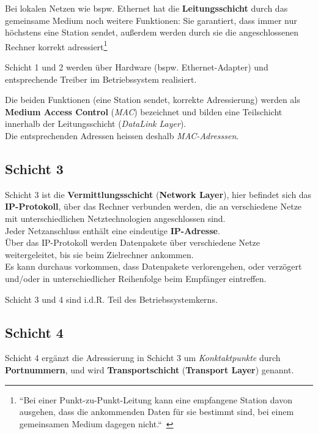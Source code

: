 \noindent
Bei lokalen Netzen wie {bspw.} Ethernet hat die \textbf{Leitungsschicht} durch das gemeinsame Medium noch weitere Funktionen: Sie garantiert, dass immer nur höchstens eine Station sendet, außerdem werden durch sie die angeschlossenen Rechner korrekt adressiert\footnote{
``Bei einer Punkt-zu-Punkt-Leitung kann eine empfangene Station davon ausgehen, dass die ankommenden Daten für sie bestimmt sind, bei einem gemeinsamen Medium dagegen nicht.``~\cite[257]{Oec22}
}

\begin{tcolorbox}
    Schicht 1 und 2 werden über Hardware ({bspw.} Ethernet-Adapter) und entsprechende Treiber im Betriebssystem realisiert.
\end{tcolorbox}

\noindent
Die beiden Funktionen (eine Station sendet, korrekte Adressierung) werden als \textbf{Medium Access Control} (\textit{MAC}) bezeichnet und bilden eine Teilschicht innerhalb der Leitungsschicht (\textit{DataLink Layer}).\\
Die entsprechenden Adressen heissen deshalb \textit{MAC-Adresssen}.

\subsection*{Schicht 3}
Schicht 3 ist die \textbf{Vermittlungsschicht} (\textbf{Network Layer}), hier befindet sich das \textbf{IP-Protokoll}, über das Rechner verbunden werden, die an verschiedene Netze mit unterschiedlichen Netztechnologien angeschlossen sind.\\

\noindent
Jeder Netzanschluss enthält eine eindeutige \textbf{IP-Adresse}.\\

\noindent
Über das IP-Protokoll werden Datenpakete über verschiedene Netze weitergeleitet, bis sie beim Zielrechner ankommen.\\

\noindent
Es kann durchaus vorkommen, dass Datenpakete verlorengehen, oder verzögert und/oder in unterschiedlicher Reihenfolge beim Empfänger eintreffen.


\begin{tcolorbox}
    Schicht 3 und 4 sind i.d.R. Teil des Betriebssystemkerns.
\end{tcolorbox}

\subsection*{Schicht 4}
Schicht 4 ergänzt die Adressierung in Schicht 3 um \textit{Konktaktpunkte} durch \textbf{Portnummern}, und wird \textbf{Transportschicht} (\textbf{Transport Layer}) genannt.\\

